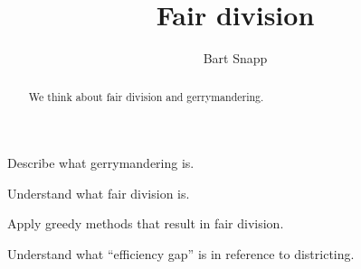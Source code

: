 \documentclass[noauthor,nooutcomes,hints,handout,12pt]{ximera}
\title{Fair division}
\author{Bart Snapp}
\begin{document}
\begin{abstract}
  We think about fair division and gerrymandering.
\end{abstract}
\maketitle

\begin{listOutcomes}
\item Describe what gerrymandering is.
\item Understand what fair division is.
\item Apply greedy methods that result in fair division.
\item Understand what ``efficiency gap'' is in reference to
  districting.
\end{listOutcomes}





\mynewpage
\end{document}
